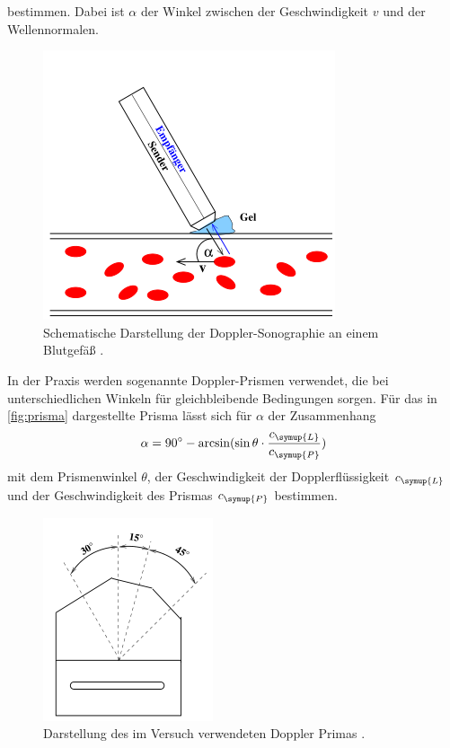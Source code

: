 bestimmen. Dabei ist $\alpha$ der Winkel zwischen der Geschwindigkeit $v$ und der Wellennormalen.
\begin{figure}
    \centering
    \includegraphics{Bilder/stroemung.png}
    \caption{Schematische Darstellung der Doppler-Sonographie an einem Blutgefäß \cite{sample}.}
    \label{fig:stroemung}
\end{figure}
In der Praxis werden sogenannte Doppler-Prismen verwendet, die bei unterschiedlichen Winkeln für gleichbleibende
Bedingungen sorgen. Für das in \autoref{fig:prisma} dargestellte Prisma lässt sich für $\alpha$ der Zusammenhang
\begin{equation}
    \label{eqn:alpha}
    \alpha = 90^{\circ} - \arcsin(\sin{\theta}\cdot \frac{c_{\symup{L}}}{c_{\symup{P}}})
\end{equation}
mit dem Prismenwinkel $\theta$, der Geschwindigkeit der Dopplerflüssigkeit $c_{\symup{L}}$ und
der Geschwindigkeit des Prismas $c_{\symup{P}}$ bestimmen.
\begin{figure}
    \centering
    \includegraphics{Bilder/prisma.png}
    \caption{Darstellung des im Versuch verwendeten Doppler Primas \cite{sample}.}
    \label{fig:prisma}
\end{figure}